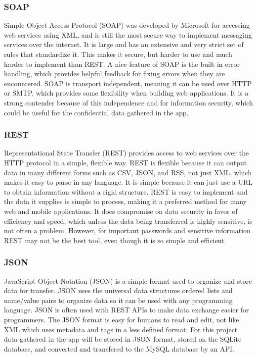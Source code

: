 \documentclass[onecolumn, draftclsnofoot,10pt, compsoc]{IEEEtran}
\begin{document}
\subsubsection{SOAP}
Simple Object Access Protocol (SOAP) was developed by Microsoft for accessing web services using XML, and is still the most secure way to implement messaging services over the internet. 
It is large and has an extensive and very strict set of rules that standardize it. 
This makes it secure, but harder to use and much harder to implement than REST. 
A nice feature of SOAP is the built in error handling, which provides helpful feedback for fixing errors when they are encountered. 
SOAP is transport independent, meaning it can be used over HTTP or SMTP, which provides some flexibility when building web applications. 
It is a strong contender because of this independence and for information security, which could be useful for the confidential data gathered in the app. 
\cite{Restvsoap}

\subsubsection{REST}
Representational State Transfer (REST) provides access to web services over the HTTP protocol in a simple, flexible way.
REST is flexible because it can output data in many different forms such as CSV, JSON, and RSS, not just XML, which makes it easy to parse in any language. 
It is simple because it can just use a URL to obtain information without a rigid structure. 
REST is easy to implement and the data it supplies is simple to process, making it a preferred method for many web and mobile applications. 
It does compromise on data security in favor of efficiency and speed, which unless the data being transferred is highly sensitive, is not often a problem. 
However, for important passwords and sensitive information REST may not be the best tool, even though it is so simple and efficient. 
\cite{Restvsoap}

\subsubsection{JSON}
JavaScript Object Notation (JSON) is a simple format used to organize and store data for transfer. 
JSON uses the universal data structures ordered lists and name/value pairs to organize data so it can be used with any programming language. 
JSON is often used with REST APIs to make data exchange easier for programmers. 
The JSON format is easy for humans to read and edit, not like XML which uses metadata and tags in a less defined format. 
For this project data gathered in the app will be stored in JSON format, stored on the SQLite database, and converted and transfered to the MySQL database by an API. 
\cite{JSON}
\end{document}
